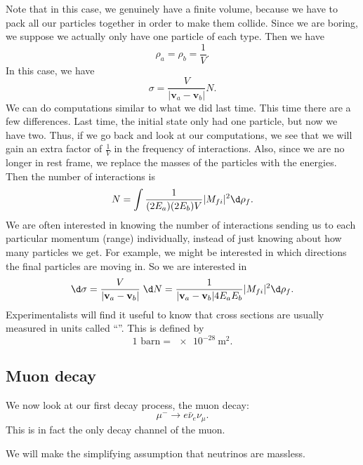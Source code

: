 \documentclass[a4paper]{article}
\begin{document}
Note that in this case, we genuinely have a finite volume, because we have to pack all our particles together in order to make them collide. Since we are boring, we suppose we actually only have one particle of each type. Then we have
\[
  \rho_a = \rho_b = \frac{1}{V}.
\]
In this case, we have
\[
  \sigma = \frac{V}{|\mathbf{v}_a - \mathbf{v}_b|} N.
\]
We can do computations similar to what we did last time. This time there are a few differences. Last time, the initial state only had one particle, but now we have two. Thus, if we go back and look at our computations, we see that we will gain an extra factor of $\frac{1}{V}$ in the frequency of interactions. Also, since we are no longer in rest frame, we replace the masses of the particles with the energies. Then the number of interactions is
\[
  N = \int \frac{1}{(2E_a) (2 E_b) V} |M_{fi}|^2 \d \rho_f.
\]
We are often interested in knowing the number of interactions sending us to each particular momentum (range) individually, instead of just knowing about how many particles we get. For example, we might be interested in which directions the final particles are moving in. So we are interested in
\[
  \d \sigma = \frac{V}{|\mathbf{v}_a - \mathbf{v}_b|}\; \d N = \frac{1}{|\mathbf{v}_a - \mathbf{v}_b| 4E_a E_b} |M_{fi}|^2 \d \rho_f.
\]
Experimentalists will find it useful to know that cross sections are usually measured in units called ``''. This is defined by
\[
  1\text{ barn} = \SI{e-28}{\meter\squared}.
\]
\subsection{Muon decay}
We now look at our first decay process, the muon decay:
\[
  \mu^- \to e \bar{\nu}_e \nu_\mu.
\]
This is in fact the only decay channel of the muon.
\begin{center}
\end{center}
We will make the simplifying assumption that neutrinos are massless.
\end{document}
